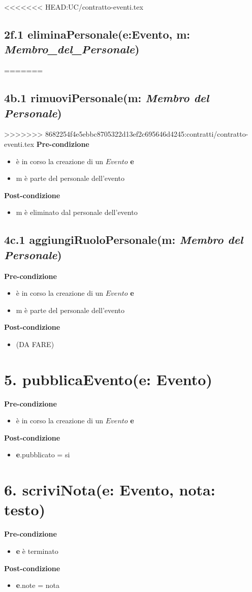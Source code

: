 \documentclass[12pt]{extarticle}
\begin{document}
<<<<<<< HEAD:UC/contratto-eventi.tex
\subsection*{2f.1 eliminaPersonale(e:Evento, m: \textit{Membro\_del\_Personale})}

=======
\subsection*{4b.1 rimuoviPersonale(m: \textit{Membro del Personale})}
>>>>>>> 8682254f4e5ebbc8705322d13ef2c695646d4245:contratti/contratto-eventi.tex
\textbf{Pre-condizione}
\begin{itemize}
  \item è in corso la creazione di un $Evento$ \textbf{e}
  \item m è parte del personale dell'evento
\end{itemize}
\textbf{Post-condizione}
\begin{itemize}
  \item m è eliminato dal personale dell'evento
\end{itemize}

\subsection*{4c.1 aggiungiRuoloPersonale(m: \textit{Membro del Personale})}
\textbf{Pre-condizione}
\begin{itemize}
  \item è in corso la creazione di un $Evento$ \textbf{e}
  \item m è parte del personale dell'evento
\end{itemize}
\textbf{Post-condizione}
\begin{itemize}
  \item (DA FARE)
\end{itemize}

\section*{5. pubblicaEvento(e: Evento)}
\textbf{Pre-condizione}
\begin{itemize}
  \item è in corso la creazione di un $Evento$ \textbf{e}
\end{itemize}
\textbf{Post-condizione}
\begin{itemize}
    \item \textbf{e}.pubblicato = si
\end{itemize}

\section*{6. scriviNota(e: Evento, nota: testo)}

\textbf{Pre-condizione}
\begin{itemize}
  \item \textbf{e} è terminato
\end{itemize}
\textbf{Post-condizione}
\begin{itemize}
  \item \textbf{e}.note = nota
\end{itemize}
\end{document}
